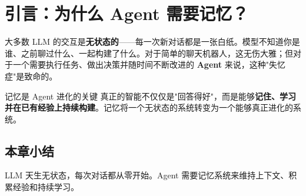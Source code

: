 \section{引言：为什么 Agent 需要记忆？}

大多数 LLM 的交互是\textbf{无状态的}——每一次新对话都是一张白纸。模型不知道你是谁、之前聊过什么、一起构建了什么。对于简单的聊天机器人，这无伤大雅；但对于一个需要执行任务、做出决策并随时间不断改进的 \textbf{Agent} 来说，这种"失忆症"是致命的。

\begin{importantbox}{记忆是 Agent 进化的关键}
真正的智能不仅仅是"回答得好"，而是能够\textbf{记住、学习并在已有经验上持续构建}。记忆将一个无状态的系统转变为一个能够真正进化的系统。
\end{importantbox}

\subsection{本章小结}

LLM 天生无状态，每次对话都从零开始。Agent 需要记忆系统来维持上下文、积累经验和持续学习。

